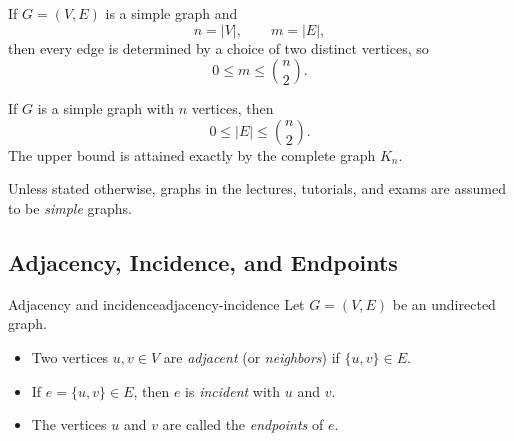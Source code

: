 If \(G=(V,E)\) is a simple graph and
\[
n=|V|,\qquad m=|E|,
\]
then every edge is determined by a choice of two distinct vertices, so
\[
0\le m\le \binom{n}{2}.
\]

\begin{keyformula}[title={Edge bound for a simple graph}]
If \(G\) is a simple graph with \(n\) vertices, then
\[
0\le |E|\le \binom{n}{2}.
\]
The upper bound is attained exactly by the complete graph \(K_n\).
\end{keyformula}

\begin{examtip}[title={Default convention in MH1301}]
Unless stated otherwise, graphs in the lectures, tutorials, and exams are assumed to be \emph{simple} graphs.
\end{examtip}

\subsection{Adjacency, Incidence, and Endpoints}

\begin{definition}{Adjacency and incidence}{adjacency-incidence}
Let \(G=(V,E)\) be an undirected graph.
\begin{itemize}[leftmargin=*]
    \item Two vertices \(u,v\in V\) are \emph{adjacent} (or \emph{neighbors}) if \(\{u,v\}\in E\).
    \item If \(e=\{u,v\}\in E\), then \(e\) is \emph{incident} with \(u\) and \(v\).
    \item The vertices \(u\) and \(v\) are called the \emph{endpoints} of \(e\).
\end{itemize}
\end{definition}

\begin{center}
\end{center}

